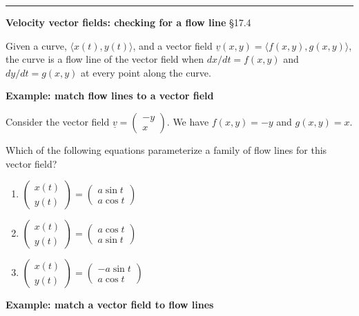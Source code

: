 \documentclass[12pt,letterpaper,noanswers]{exam}
\newcommand{\mb}[1]{\underline{#1}}
\begin{document}
\vspace{0.2cm}
\hrule
\vspace{0.2cm}

\noindent\textbf{Velocity vector fields: checking for a flow line} \S 17.4
\begin{tcolorbox}
 Given a curve, $\langle x(t), y(t)\rangle$, and a vector field $\mb v(x,y) = \langle f(x,y), g(x,y)\rangle$, the curve is a flow line of the vector field when $dx/dt = f(x,y)$ and $dy/dt = g(x,y)$ at every point along the curve.
\end{tcolorbox}

\eject

\noindent\textbf{Example: match flow lines to a vector field}

Consider the vector field $\mb v = \left(\begin{array}{r}-y \\ x\end{array}\right)$.  We have $f(x,y) = -y$ and $g(x,y) = x$.

Which of the following equations parameterize a family of flow lines for this vector field?
\begin{enumerate}
\itemsep2em
    \item $\left(\begin{array}{r}x(t) \\ y(t)\end{array}\right)=\left(\begin{array}{r} a\sin t \\ a\cos t\end{array}\right)$
     \item $\left(\begin{array}{r}x(t) \\ y(t)\end{array}\right)=\left(\begin{array}{r} a\cos t \\ a\sin t\end{array}\right)$
     \item $\left(\begin{array}{r}x(t) \\ y(t)\end{array}\right)=\left(\begin{array}{r} -a\sin t \\ a\cos t\end{array}\right)$
\end{enumerate}
\vspace{0.5in}

\noindent\textbf{Example: match a vector field to flow lines}
\end{document}
